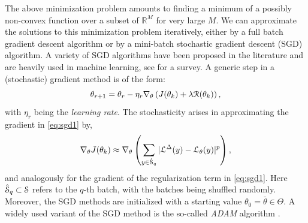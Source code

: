 \documentclass[a4paper]{article}
\numberwithin{equation}{section}
\numberwithin{equation}{section}
\theoremstyle{definition}
\theoremstyle{myremarkstyle}
\newcommand{\R}{\mathbb{R}}
\newcommand{\map}{\EuScript{L}}
\newcommand{\train}{\EuScript{S}}
\newcommand{\reg}{\EuScript{R}}
\begin{document}
The above minimization problem amounts to finding a minimum of a possibly non-convex function over a subset of $\R^M$ for very large $M$. We can approximate the solutions to this minimization problem iteratively, either by a full batch gradient descent algorithm or by a mini-batch stochastic gradient descent (SGD) algorithm. A variety of SGD algorithms have been proposed in the literature and are heavily used in machine learning, see \cite{SG} for a survey.  A generic step in a (stochastic) gradient method is of the form:
\begin{equation}
\label{eq:sgd1}
\theta_{r+1} = \theta_r - \eta_r \nabla_{\theta}\left(J(\theta_k) + \lambda \reg(\theta_k)\right),
\end{equation}
with $\eta_r$ being the \emph{learning rate}. The stochasticity arises in approximating the gradient in \eqref{eq:sgd1} by,
\begin{equation}
\label{eq:sgd2}
\nabla_{\theta} J(\theta_k) \approx \nabla_{\theta}\left(\sum_{y \in \hat{\train}_q}   |\map^{\Delta}(y) - \map_{\theta} (y) |^p \right),
\end{equation}
and analogously for the gradient of the regularization term in \eqref{eq:sgd1}. Here $\hat{\train}_q \subset \train$ refers to the $q$-th batch, with the batches being shuffled randomly. Moreover, the SGD methods are initialized with a starting value $\theta_0 = \bar{\theta} \in \Theta$. A widely used variant of the SGD method is the so-called \emph{ADAM} algorithm \cite{ADAM}. 
\end{document}

